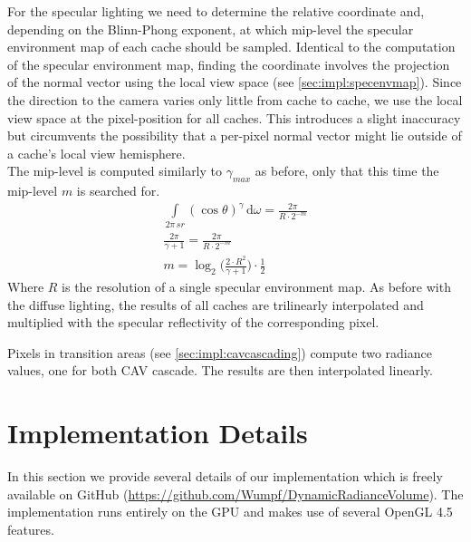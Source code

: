 \documentclass[thesis.tex]{subfiles}
\begin{document}
For the specular lighting we need to determine the relative coordinate and, depending on the Blinn-Phong exponent, at which mip-level the specular environment map of each cache should be sampled.
Identical to the computation of the specular environment map, finding the coordinate involves the projection of the normal vector using the local view space (see \autoref{sec:impl:specenvmap}).
Since the direction to the camera varies only little from cache to cache, we use the local view space at the pixel-position for all caches.
This introduces a slight inaccuracy but circumvents the possibility that a per-pixel normal vector might lie outside of a cache's local view hemisphere.\\
The mip-level is computed similarly to $\gamma_{max}$ as before, only that this time the mip-level $m$ is searched for.
\begin{align}
\int\limits_{2\pi\,sr} (\cos\theta)^{\gamma}  \,\mathrm{d}\omega = \frac{2\pi}{R \cdot 2^{-m}}\\
\frac{2\pi}{\gamma + 1} = \frac{2\pi}{R \cdot 2^{-m}}\\
m = \log_2 \Big(\frac{2 \cdot R^2}{\gamma + 1} \Big) \cdot \frac{1}{2}
\end{align}
Where $R$ is the resolution of a single specular environment map.
As before with the diffuse lighting, the results of all caches are trilinearly interpolated and multiplied with the specular reflectivity of the corresponding pixel.

Pixels in transition areas (see \autoref{sec:impl:cavcascading}) compute two radiance values, one for both CAV cascade.
The results are then interpolated linearly.


\section{Implementation Details}
In this section we provide several details of our implementation which is freely available on GitHub (\url{https://github.com/Wumpf/DynamicRadianceVolume}).
The implementation runs entirely on the GPU and makes use of several OpenGL 4.5 features.
\end{document}
